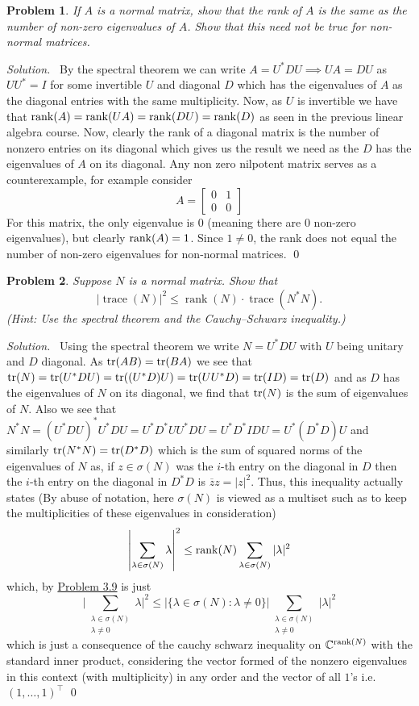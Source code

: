 \documentclass[12pt,a4paper]{article}
\newenvironment{solution}{%
  \par\noindent\textit{Solution.}\ }{\qed}
\theoremstyle{problemstyle}
\newtheorem{problem}{Problem}[section]
\def\bC{\mathbb{C}}
\begin{document}
\begin{problem}\label{prob:3-9}
If $A$ is a normal matrix, show that the rank of $A$ is the same as the number of non-zero eigenvalues of $A$. Show that this need not be true for non-normal matrices.
\end{problem}
\begin{solution}
	By the spectral theorem we can write $A=U^*DU\implies UA=DU$ as $UU^*=I$ for some invertible $U$ and diagonal $D$ which has the eigenvalues of $A$ as the diagonal entries with the same multiplicity. Now, as $U$ is invertible we have that $\rank(A)=\rank(UA)=\rank(DU)=\rank(D)$ as seen in the previous linear algebra course. Now, clearly the rank of a diagonal matrix is the number of nonzero entries on its diagonal which gives us the result we need as the $D$ has the eigenvalues of $A$ on its diagonal. Any non zero nilpotent matrix serves as a counterexample, for example consider
\[
    A = \begin{bmatrix}
		0 & 1\\ 0 & 0
    \end{bmatrix}
\]
For this matrix, the only eigenvalue is $0$ (meaning there are $0$ non-zero eigenvalues), but clearly $\rank(A)=1$. Since $1\neq 0$, the rank does not equal the number of non-zero eigenvalues for non-normal matrices.
\end{solution}
\begin{problem}\label{prob:3-10}
Suppose $N$ is a normal matrix. Show that
\[
|\operatorname{trace}(N)|^2 \leq \operatorname{rank}(N) \cdot \operatorname{trace}(N^*N).
\]
(\textit{Hint}: Use the spectral theorem and the Cauchy--Schwarz inequality.)
\end{problem}
\begin{solution}
	Using the spectral theorem we write $N=U^*DU$ with $U$ being unitary and $D$ diagonal. As $\trace(AB)=\trace(BA)$ we see that $\trace(N)=\trace(U^*DU)=\trace((U^*D)U)=\trace(UU^*D)=\trace(ID)=\trace(D)$ and as $D$ has the eigenvalues of $N$ on its diagonal, we find that $\trace(N)$ is the sum of eigenvalues of $N$. Also we see that $N^*N=(U^*DU)^*U^*DU=U^*D^*UU^*DU=U^*D^*IDU=U^*(D^*D)U$ and similarly $\trace(N^*N)=\trace(D^*D)$ which is the sum of squared norms of the eigenvalues of $N$ as, if $z\in\sigma(N)$ was the $i$-th entry on the diagonal in $D$ then the $i$-th entry on the diagonal in $D^*D$ is $\overline{z}z=|z|^2$. Thus, this inequality actually states (By abuse of notation, here $\sigma(N)$ is viewed as a multiset such as to keep the multiplicities of these eigenvalues in consideration)
	\[
		\qty|\sum_{\lambda\in\sigma(N)}\lambda|^2\leq\rank(N)\sum_{\lambda\in\sigma(N)}|\lambda|^2
	\]
	which, by \hyperref[prob:3-9]{Problem 3.9} is just
	\[
		\Bigg|\sum_{\substack{\lambda\in\sigma(N)\\ \lambda\neq 0}}\lambda\Bigg|^2\leq|\{\lambda\in\sigma(N):\lambda\neq 0\}|\sum_{\substack{\lambda\in\sigma(N)\\ \lambda\neq 0}}|\lambda|^2
	\]
	which is just a consequence of the cauchy schwarz inequality on $\bC^{\rank(N)}$ with the standard inner product, considering the vector formed of the nonzero eigenvalues in this context (with multiplicity) in any order and the vector of all $1$'s i.e. $(1,\ldots,1)^{\top}$
\end{solution}
\end{document}
